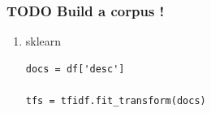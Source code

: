 \documentclass[11pt]{article}
\begin{document}
\subsubsection{{\bfseries\sffamily TODO} Build a corpus !}
\label{sec:orgde43555}

\begin{enumerate}
\item sklearn
\label{sec:org38809d1}
\begin{verbatim}
docs = df['desc']

tfs = tfidf.fit_transform(docs)
\end{verbatim}
\end{enumerate}
\end{document}
